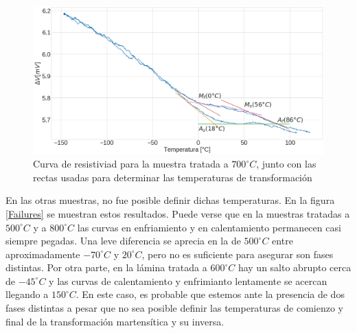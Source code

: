 \documentclass{article}
\theoremstyle{definition}
\theoremstyle{remark}
\begin{document}
\begin{figure}[H]
 	\centering
	\includegraphics[scale=0.3]{img/Resistance_700.png}
 	\caption{Curva de resistiviad para la muestra tratada a $700 ^\circ C$, junto con las rectas usadas para determinar las temperaturas de transformación}
	\label{Res700}
\end{figure}

En las otras muestras, no fue posible definir dichas temperaturas. En la figura \ref{Failures} se muestran estos resultados. Puede verse que en la muestras tratadas a $500 ^\circ C$ y a $800 ^\circ C$ las curvas en enfriamiento y en calentamiento permanecen casi siempre pegadas. Una leve diferencia se aprecia en la de  $500 ^\circ C$ entre aproximadamente $-70 ^\circ C$ y $20 ^\circ C$, pero no es suficiente para asegurar son fases distintas. Por otra parte, en la lámina tratada a $600 ^\circ C$ hay un salto abrupto cerca de  $-45 ^\circ C$ y las curvas de calentamiento y enfrimianto lentamente se acercan llegando a $150 ^\circ C$. En este caso, es probable que estemos ante la presencia de dos fases distintas a pesar que no sea posible definir las temperaturas de comienzo y final de la transformación martensítica y su inversa. 
\end{document}
